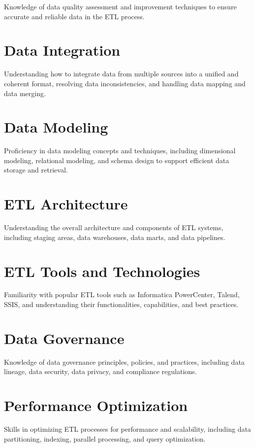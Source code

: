 Knowledge of data quality assessment and improvement techniques to ensure accurate and reliable data in the ETL process.

\section{Data Integration}

Understanding how to integrate data from multiple sources into a unified and coherent format, resolving data inconsistencies, and handling data mapping and data merging.

\section{Data Modeling}

Proficiency in data modeling concepts and techniques, including dimensional modeling, relational modeling, and schema design to support efficient data storage and retrieval.

\section{ETL Architecture}

Understanding the overall architecture and components of ETL systems, including staging areas, data warehouses, data marts, and data pipelines.

\section{ETL Tools and Technologies}

Familiarity with popular ETL tools such as Informatica PowerCenter, Talend, SSIS, and understanding their functionalities, capabilities, and best practices.

\section{Data Governance}

Knowledge of data governance principles, policies, and practices, including data lineage, data security, data privacy, and compliance regulations.

\section{Performance Optimization}

Skills in optimizing ETL processes for performance and scalability, including data partitioning, indexing, parallel processing, and query optimization.

